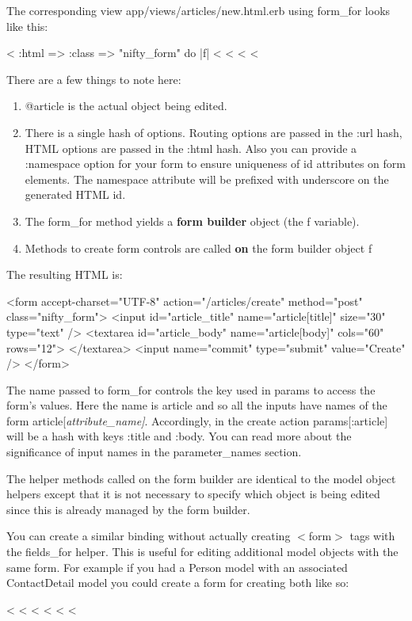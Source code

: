 \documentclass[10pt]{book}
\newenvironment{code}{%
  \scriptsize
    \verbatim
}{%
    \endverbatim
    \newline
}
\begin{document}
The corresponding view app/views/articles/new.html.erb using form\_for looks like this:
\begin{code}
<%
    :html => {:class => "nifty_form"} do |f| %
  <%
  <%
  <%
<%
\end{code}

There are a few things to note here:
\begin{enumerate}
	\item @article is the actual object being edited.
	\item There is a single hash of options. Routing options are passed in the :url hash, HTML options are passed in the :html hash. Also you can provide a :namespace  option for your form to ensure uniqueness of id attributes on form  elements. The namespace attribute will be prefixed with underscore on  the generated HTML id.
	\item The form\_for method yields a \textbf{form builder} object (the f variable).
	\item Methods to create form controls are called \textbf{on} the form builder object f
\end{enumerate}

The resulting HTML is:
\begin{code}
<form accept-charset="UTF-8" action="/articles/create" 
                      method="post" class="nifty_form">
<input id="article_title" name="article[title]" size="30" type="text" />
<textarea id="article_body" name="article[body]" cols="60" rows="12">
</textarea>
<input name="commit" type="submit" value="Create" />
</form>
\end{code}

The name passed to form\_for controls the key used in params to access the form’s values. Here the name is article and so all the inputs have names of the form article[\emph{attribute\_name]}. Accordingly, in the create action params[:article] will be a hash with keys :title and :body. You can read more about the significance of input names in the parameter\_names section.

The helper methods called on the form builder are identical to the  model object helpers except that it is not necessary to specify which  object is being edited since this is already managed by the form  builder.

You can create a similar binding without actually creating $<$form$>$ tags with the fields\_for  helper. This is useful for editing additional model objects with the  same form. For example if you had a Person model with an associated  ContactDetail model you could create a form for creating both like so:
\begin{code}
<%
  <%
  <%
    <%
  <%
<%
\end{code}
\end{document}
